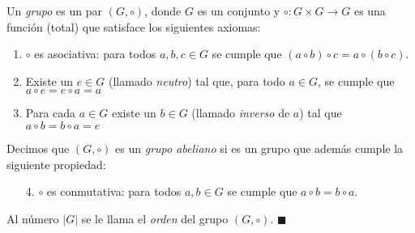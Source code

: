 

\begin{definition}
Un \emph{grupo} es un par $(G,\circ)$, donde $G$ es un conjunto y $\circ \colon G\times G\to G$ es una función (total) que satisface los siguientes axiomas:
\begin{enumerate}
	\item $\circ$ es asociativa: para todos $a,b,c \in G$ se cumple que $(a \circ b) \circ c = a \circ (b
\circ c)$.

	\item Existe un $e \in G$ (llamado \emph{neutro}) tal que, para todo $a \in G$, se cumple que $a \circ e = e \circ a = a$

   \item Para cada $a \in G$ existe un $b \in G$ (llamado \emph{inverso} de $a$) tal que $a \circ b 	= b \circ a = e$
\end{enumerate}
Decimos que $(G,\circ)$ es un \emph{grupo abeliano} si es un grupo que además cumple la siguiente propiedad:
\begin{enumerate}
	\item[4.] $\circ$ es conmutativa: para todos $a,b\in G$ se cumple que $a\circ b = b\circ a$. 
\end{enumerate}
Al número $|G|$ se le llama el \emph{orden} del grupo $(G, \circ)$. \hfill$\blacksquare$
\end{definition}

